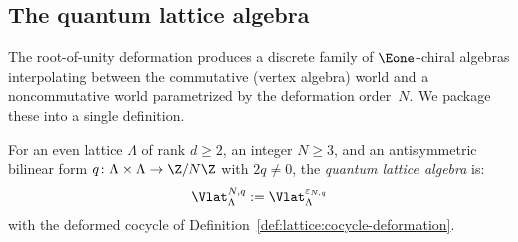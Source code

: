 \subsection{The quantum lattice algebra}

The root-of-unity deformation produces a discrete family of
$\Eone$-chiral algebras interpolating between the commutative (vertex
algebra) world and a noncommutative world parametrized by the
deformation order~$N$. We package these into a single definition.

\begin{definition}\label{def:quantum-lattice}
For an even lattice $\Lambda$ of rank $d \geq 2$, an integer
$N \geq 3$, and an antisymmetric bilinear form
$q \colon \Lambda \times \Lambda \to \Z/N\Z$ with $2q\neq0$, the
\emph{quantum lattice algebra} is:
\[
\Vlat_\Lambda^{N,q}
:= \Vlat_\Lambda^{\varepsilon_{N,q}}
\]
with the deformed cocycle of Definition~\ref{def:lattice:cocycle-deformation}.
\end{definition}

